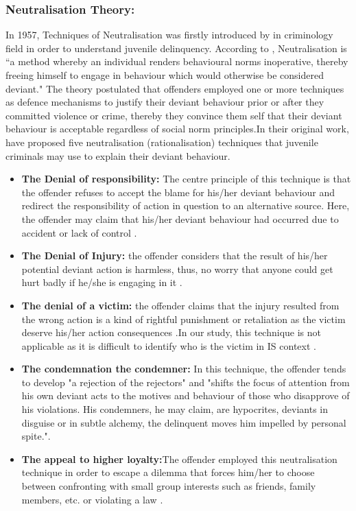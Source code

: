 \subsubsection{Neutralisation Theory:}
In 1957, Techniques of Neutralisation was firstly introduced by \citet{Sykes1957} in criminology field in order to understand juvenile delinquency. According to \cite{Rogers1974}, Neutralisation is “a method whereby an individual renders behavioural norms inoperative, thereby freeing himself to engage in behaviour which would otherwise be considered deviant." The theory postulated that offenders employed one or more techniques as defence mechanisms to justify their deviant behaviour prior or after they committed violence or crime, thereby they convince them self that their deviant behaviour is acceptable regardless of social norm principles\cite{Teh2015}.In their original work, \citet{Sykes1957}have proposed five neutralisation (rationalisation) techniques that juvenile criminals may use to explain their deviant behaviour.
\begin{itemize}
	\item \textbf{The Denial of responsibility:} The centre principle of this technique is that the offender refuses to accept the blame for his/her deviant behaviour and redirect the responsibility of action in question to an alternative source. Here, the offender may claim that his/her deviant behaviour had occurred due to accident or lack of control \cite{Sykes1957}.   
	\item \textbf{The Denial of Injury:} the offender considers that the result of his/her potential deviant action is harmless, thus, no worry that anyone could get hurt badly if he/she is engaging in it \cite{Sykes1957}. 
	\item \textbf{The denial of a victim:} the offender claims that the injury resulted from the wrong action is a kind of rightful punishment or retaliation as the victim deserve his/her action consequences \cite{Sykes1957}.In our study, this technique is not applicable as it is difficult to identify who is the victim in IS context \citet{Siponen2010}.
	\item \textbf{The condemnation the condemner:} In this technique, the offender tends to develop "a rejection of the rejectors" and "shifts the focus of attention from his own deviant acts to the motives and behaviour of those who disapprove of his violations. His condemners, he may claim, are hypocrites, deviants in disguise or in subtle alchemy, the delinquent moves him impelled by personal spite."\cite{Sykes1957}.
	\item \textbf{The appeal to higher loyalty:}The offender employed this neutralisation technique in order to escape a dilemma that forces him/her to choose between confronting with small group interests such as friends, family members, etc. or violating a law \cite{Sykes1957}.    
\end{itemize}
